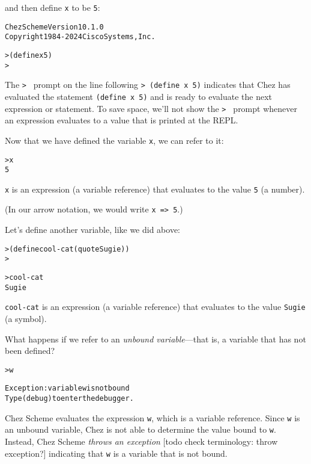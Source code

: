 \documentclass{book}
\begin{document}
\noindent
and then define \verb|x| to be \verb|5|:

\begin{alltt}
Chez Scheme Version 10.1.0
Copyright 1984-2024 Cisco Systems, Inc.

> (define x 5)
> 
\end{alltt}

The \verb|> | prompt on the line following \verb|> (define x 5)| indicates that Chez has evaluated the statement \verb|(define x 5)| and is ready to evaluate the next expression or statement.  To save space, we'll not show the \verb|> | prompt whenever an expression evaluates to a value that is printed at the REPL.

Now that we have defined the variable \verb|x|, we can refer to it:

\begin{alltt}
> x
5
\end{alltt}

\noindent
\verb|x| is an expression (a variable reference) that evaluates to the value \verb|5| (a number).

(In our arrow notation, we would write \verb|x => 5|.)

Let's define another variable, like we did above:

\begin{alltt}
> (define cool-cat (quote Sugie))
> 
\end{alltt}

\begin{alltt}
> cool-cat
Sugie
\end{alltt}

\noindent
\verb|cool-cat| is an expression (a variable reference) that evaluates to the value \verb|Sugie| (a symbol).

What happens if we refer to an \emph{unbound variable}---that is, a variable that has not been defined?

\begin{alltt}
> w

Exception: variable w is not bound
Type (debug) to enter the debugger. 
\end{alltt}

\noindent
Chez Scheme evaluates the expression \verb|w|, which is a variable reference.
Since \verb|w| is an unbound variable, Chez is not able to determine the value bound to \verb|w|.
Instead, Chez Scheme \emph{throws an exception} [todo check terminology: throw exception?] indicating that \verb|w| is a variable that is not bound.
\end{document}

